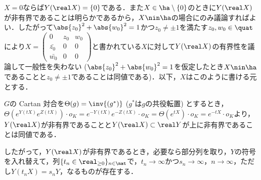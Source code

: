 \begin{npfwn}
  
  $X = 0$ならば$ Y(\real X) = \{0\} $である．また$X\in \ha\setminus\{0\} $のときに$Y(\real X) $が非有界であることは明らかであるから，$X\nin \ha $の場合にのみ議論すればよい．したがって$\abs{z_0}^2 +\abs{w_0}^2  = 1 $かつ$ z_0 \neq \pm 1 $を満たす$z_0,w_0\in \quat$により$X =  \begin{pmatrix}
    0 & z_0 & w_0 \\
    \bar{z_0} & 0 & 0 \\
    \bar{w_0} & 0 & 0 
  \end{pmatrix}$と書かれている$X$に対して$Y(\real X) $の有界性を議論して一般性を失わない ($\abs{z_0}^2 +\abs{w_0}^2  = 1 $を仮定したとき$X\nin \ha $であることと$z_0\neq \pm 1$であることは同値である)．以下，$X$はこのように書ける元とする．%

  $G$の Cartan 対合を$\Theta(g) = \inv{(g^{*})} $ ($g^{*}$は$g$の共役転置) とするとき，$\Theta(e^{Y(tX)}e^{Z(tX)})\cdot o_K = e^{-Y(tX)}e^{-Z(tX)}\cdot o_K = \Theta(e^{tX})\cdot o_K = e^{-tX}\cdot o_K $より，$Y(\real X) $が非有界であることと$ Y(\real X)\subset \real Y $が上に非有界であることは同値である．

  したがって，$Y (\real X) $が非有界であるとき，必要なら部分列を取り，$Y$の符号を入れ替えて，列$\{t_n \in \real_{\geq 0} \}_{n\in \nat} $で，$t_n\to \infty$かつ$s_n\to \infty$，$ n\to \infty$，ただし$Y(t_n X) = s_n Y$，なるものが存在する．


\end{npfwn}
